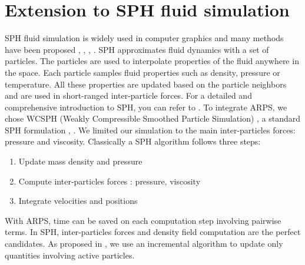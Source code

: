 \documentclass[11pt, oneside, a4paper]{memoir}
\begin{document}
\section{ Extension to SPH fluid simulation } \label{sec sph}
SPH fluid simulation is widely used in computer graphics and many methods have been proposed \cite{Desbrun:1996:SPN}, \cite{Muller2003}, \cite{Solenthaler2009}, \cite{implicitSPH}.
SPH approximates fluid dynamics with a set of particles.
The particles are used to interpolate properties of the fluid anywhere in the space.
Each particle samples fluid properties such as density, pressure or temperature. All these properties are updated based on the particle neighbors and are
used in short-ranged inter-particle forces.
For a detailed and comprehensive introduction to SPH, you can refer to \cite{Monaghan2005}.
To integrate ARPS, we chose WCSPH (Weakly Compressible Smoothed Particle Simulation) \cite{Becker2007WCSPH}, a standard SPH formulation \cite{Desbrun:1996:SPN}, \cite{Muller2003}.
We limited our simulation to the main inter-particles forces: pressure and viscosity.
Classically a SPH algorithm follows three steps:
\begin{enumerate}
	\item Update mass density and pressure
	\item Compute inter-particles forces : pressure, viscosity
	\item Integrate velocities and positions
\end{enumerate}
With ARPS, time can be saved on each computation step involving pairwise terms.
In SPH, inter-particles forces and density field computation are the perfect candidates.
As proposed in \cite{Artemova2012}, we use an incremental algorithm to update only quantities involving active particles.
\end{document}
